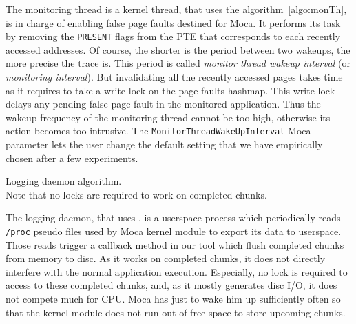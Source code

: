 The monitoring thread is a kernel thread, that uses the algorithm~\ref{algo:monTh}, is in charge of enabling false page faults destined for \gls{Moca}.
It performs its task by removing the \texttt{PRESENT} flags from the \gls{PTE} that corresponds to each recently accessed addresses.
Of course, the shorter is the period between two wakeups, the more precise the trace is.
This period is called \emph{monitor thread wakeup interval} (or \emph{monitoring interval}).
But invalidating all the recently accessed pages takes time as it requires to take a write lock on the page faults hashmap.
This write lock delays any pending false page fault in the monitored application.
Thus the wakeup frequency of the monitoring thread cannot be too high, otherwise its action becomes too intrusive.
The \texttt{MonitorThreadWakeUpInterval} \gls{Moca} parameter lets the user change the default setting that we have empirically chosen after a few experiments.

\begin{algorithm}[htb]
    \caption[Moca Logging daemon algorithm.]{Logging daemon algorithm.\\
        \footnotesize{Note that no locks are required to work on completed chunks.}}
    \label{alg:moca-log}
    \begin{algorithmic}[1]
                \State {}
                \State {}
                \EndFor
            \EndFor
            \State {}
        \EndWhile
    \end{algorithmic}
\end{algorithm}

The logging daemon, that uses , is a userspace process which periodically reads \texttt{/proc} pseudo files used by \gls{Moca} kernel module to export its data to userspace.
Those reads trigger a callback method in our tool which flush completed chunks from memory to disc.
As it works on completed chunks, it does not directly interfere with the normal application execution.
Especially, no lock is required to access to these completed chunks, and, as it mostly generates disc I/O, it does not compete much for CPU.
\gls{Moca} has just to wake him up sufficiently often so that the kernel module does not run out of free space to store upcoming chunks.

